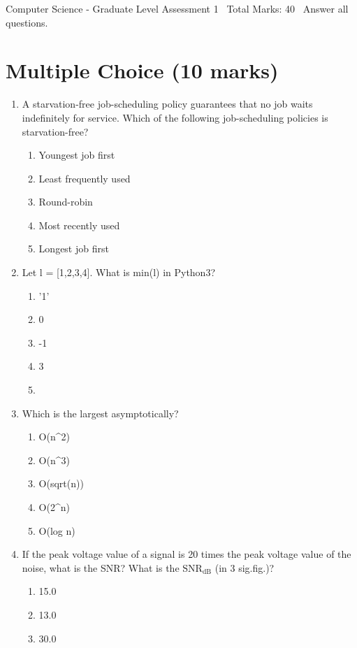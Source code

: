\documentclass[12pt]{article}
\begin{document}
\begin{center}
Computer Science - Graduate Level Assessment 1 \
Total Marks: 40 \
Answer all questions.
\end{center}

\section*{Multiple Choice (10 marks)}
\begin{enumerate}[label=\arabic*.]
\item A starvation-free job-scheduling policy guarantees that no job waits indefinitely for
service. Which of the following job-scheduling policies is starvation-free?
\begin{enumerate}[label=(\alph*)]
    \item Youngest job first
    \item Least frequently used
    \item Round-robin
    \item Most recently used
    \item Longest job first
\end{enumerate}
\item Let l = [1,2,3,4]. What is min(l) in Python3?
\begin{enumerate}[label=(\alph*)]
    \item '1'
    \item 0
    \item -1
    \item 3
    \item [1,2,3,4]
\end{enumerate}
\item Which is the largest asymptotically?
\begin{enumerate}[label=(\alph*)]
    \item O(n\^{}2)
    \item O(n\^{}3)
    \item O(sqrt(n))
    \item O(2\^{}n)
    \item O(log n)
\end{enumerate}
\item If the peak voltage value of a signal is 20 times the peak voltage value of the noise,
what is the SNR? What is the $\mathrm{SNR}_{\mathrm{dB}}$ (in 3 sig.fig.)?
\begin{enumerate}[label=(\alph*)]
    \item 15.0
    \item 13.0
    \item 30.0

\end{enumerate}
\end{enumerate}
\end{document}
